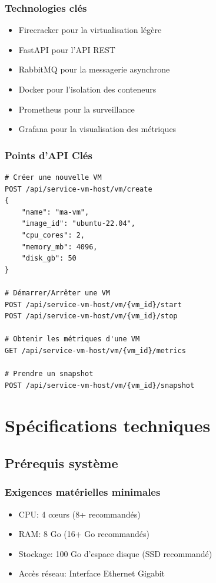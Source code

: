 \documentclass[12pt,a4paper]{report}
\begin{document}
\subsection{Technologies clés}
\begin{itemize}
    \item Firecracker pour la virtualisation légère
    \item FastAPI pour l'API REST
    \item RabbitMQ pour la messagerie asynchrone
    \item Docker pour l'isolation des conteneurs
    \item Prometheus pour la surveillance
    \item Grafana pour la visualisation des métriques
\end{itemize}

\subsection{Points d'API Clés}
\begin{verbatim}
# Créer une nouvelle VM
POST /api/service-vm-host/vm/create
{
    "name": "ma-vm",
    "image_id": "ubuntu-22.04",
    "cpu_cores": 2,
    "memory_mb": 4096,
    "disk_gb": 50
}

# Démarrer/Arrêter une VM
POST /api/service-vm-host/vm/{vm_id}/start
POST /api/service-vm-host/vm/{vm_id}/stop

# Obtenir les métriques d'une VM
GET /api/service-vm-host/vm/{vm_id}/metrics

# Prendre un snapshot
POST /api/service-vm-host/vm/{vm_id}/snapshot
\end{verbatim}

\chapter{Spécifications techniques}
\section{Prérequis système}
\subsection{Exigences matérielles minimales}
\begin{itemize}
    \item CPU: 4 cœurs (8+ recommandés)
    \item RAM: 8 Go (16+ Go recommandés)
    \item Stockage: 100 Go d'espace disque (SSD recommandé)
    \item Accès réseau: Interface Ethernet Gigabit
\end{itemize}
\end{document}
